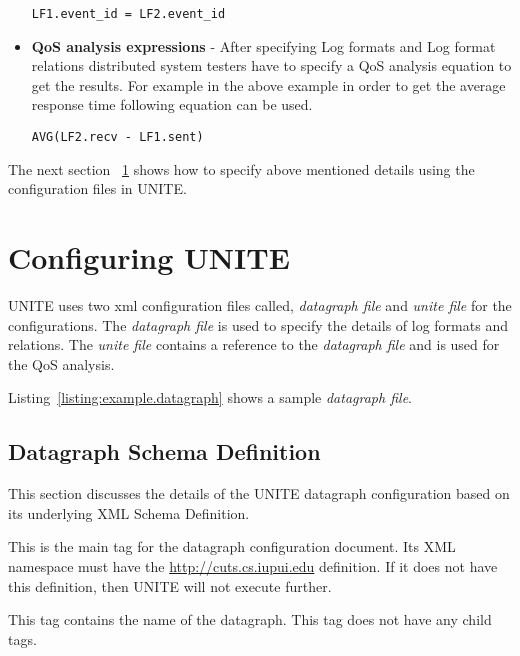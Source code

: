 \begin{itemize}
  \texttt{LF1.event\_id = LF2.event\_id}
  
  \item \textbf{QoS analysis expressions} - After specifying Log formats and 
  Log format relations distributed system testers have to specify a QoS analysis 
  equation to get the results. For example in the above example in order to 
  get the average response time following equation can be used.
  
  \texttt{AVG(LF2.recv - LF1.sent)}
  
\end{itemize}

The next section ~\ref{sec:unite-config} shows how to specify above 
mentioned details using the configuration files in UNITE.

\section{Configuring UNITE}
\label{sec:unite-config}

UNITE uses two xml configuration files called, \textit{datagraph file} and 
\textit{unite file} for the configurations. The \textit{datagraph file} is used to 
specify the details of log formats and relations. The \textit{unite file} 
contains a reference to the \textit{datagraph file} and is used for the 
QoS analysis.

Listing~\ref{listing:example.datagraph} shows a sample \textit{datagraph file}. 



\subsection{Datagraph Schema Definition}
\label{sec:datagraph}

This section discusses the details of the UNITE datagraph configuration 
based on its underlying XML Schema Definition.

This is the main tag for the datagraph configuration document. Its 
XML namespace must have the \url{http://cuts.cs.iupui.edu} definition. If it does
not have this definition, then UNITE will not execute further.


This tag contains the name of the datagraph. This tag does not have 
any child tags.

